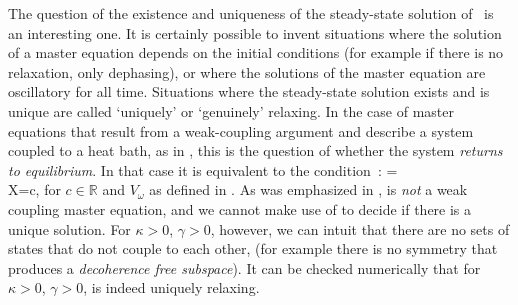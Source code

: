 The question of the existence and uniqueness of the steady-state solution of~ is an interesting one. It is certainly possible to invent situations where the solution of a master equation depends on the initial conditions (for example if there is no relaxation, only dephasing), or where the solutions of the master equation are oscillatory for all time. Situations where the steady-state solution exists and is unique are called `uniquely' or `genuinely' relaxing. In the case of master equations that result from a weak-coupling argument and describe a system coupled to a heat bath, as in , this is the question of whether the system \emph{returns to equilibrium}. In that case it is equivalent to the condition~\cite{alicki_lendi}:
\be
    \quad{}= \nonumber\\
    \quad X=c\openone ,\label{eq:relaxing}
\ee
for $c\in\mathbb{R}$ and $V_\omega$ as defined in .
As was emphasized in ,  is \emph{not} a weak coupling master equation, and we cannot make use of  to decide if there is a unique solution. For $\kappa>0$, $\gamma>0$, however, we can intuit that there are no sets of states that do not couple to each other, (for example there is no symmetry that produces a \emph{decoherence free subspace}). It can be checked numerically that for  $\kappa>0$, $\gamma>0$,  is indeed uniquely relaxing.

